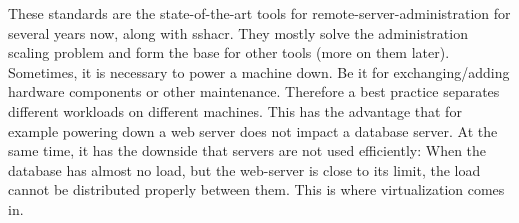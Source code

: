 \newline
These standards are the state-of-the-art tools for remote-server-administration for several years now, along with \gls{sshacr}. They mostly solve the administration scaling problem and form the base for other tools (more on them later).
\newline
Sometimes, it is necessary to power a machine down. Be it for exchanging/adding hardware components or other maintenance. Therefore a best practice separates different workloads on different machines. This has the advantage that for example powering down a web server does not impact a database server. At the same time, it has the downside that servers are not used efficiently: When the database has almost no load, but the web-server is close to its limit, the load cannot be distributed properly between them. This is where virtualization comes in.


